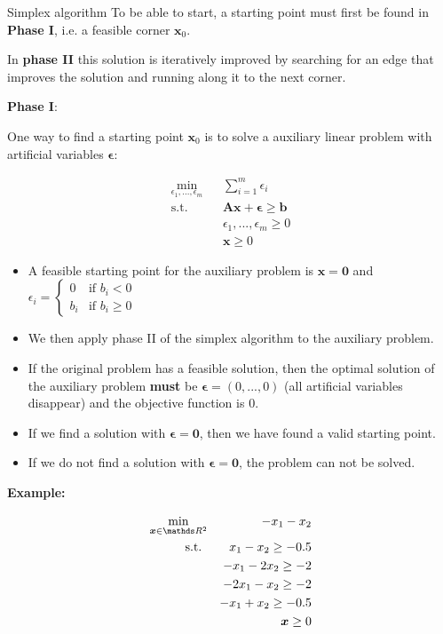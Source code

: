 \documentclass[11pt,compress,t,notes=noshow, xcolor=table]{beamer}
\begin{document}
\begin{vbframe}{Simplex algorithm}
To be able to start, a starting point must first be found in \textbf{Phase I}, i.e. a feasible corner $\bm{x}_0$.

\lz

In \textbf{phase II} this solution is iteratively improved by searching for an edge that improves the solution and running along it to the next corner.

\framebreak

\textbf{Phase I}:

One way to find a starting point $\bm{x}_0$ is to solve a auxiliary linear problem with artificial variables $\bm{\epsilon}$:

\begin{eqnarray*}
\min_{\epsilon_1, ..., \epsilon_m} && \sum_{i = 1}^m \epsilon_i \\
\text{s.t. } && \bm{Ax} + \bm{\epsilon} \ge \bm{b} \\
&& \epsilon_1, ..., \epsilon_m \ge 0\\
&& \bm{x} \ge 0
\end{eqnarray*}

\begin{itemize}
\item A feasible starting point for the auxiliary problem is $\bm{x} = \bm{0}$ and $\epsilon_i = \begin{cases} 0 & \text{if } b_i < 0 \\
b_i & \text{if } b_i \ge 0
\end{cases}$
\item We then apply phase II of the simplex algorithm to the auxiliary problem.
\item If the original problem has a feasible solution, then the optimal solution of the auxiliary problem \textbf{must} be $\bm{\epsilon} = (0, ..., 0)$ (all artificial variables disappear) and the objective function is $0$.
\item If we find a solution with $\bm{\epsilon} = \bm{0}$, then we have found a valid starting point.
\item If we do not find a solution with $\bm{\epsilon} = \bm{0}$, the problem can not be solved.
\end{itemize}

\framebreak

\textbf{Example:}

\begin{eqnarray*}
\min_{\bm{x} \in \R^2} && -x_1 - x_2 \\
\text{s.t. } && x_1 - x_2 \ge - 0.5 \\
&& - x_1 - 2 x_2 \ge - 2 \\
&& - 2x_1 - x_2 \ge - 2 \\
&& - x_1 + x_2 \ge - 0.5 \\
&& \bm{x} \ge 0
\end{eqnarray*}


\end{vbframe}
\end{document}
